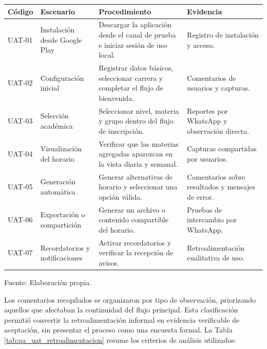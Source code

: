\begin{enumerate}
\begin{center}
\begin{minipage}{\linewidth}
\centering
\begin{tabularx}{\linewidth}{@{}p{1.8cm}>{\RaggedRight\arraybackslash}X>{\RaggedRight\arraybackslash}X>{\RaggedRight\arraybackslash}p{3.2cm}@{}}
\toprule
Código & Escenario & Procedimiento & Evidencia \\
\midrule
UAT-01 & Instalación desde Google Play & Descargar la aplicación desde el canal de prueba e iniciar sesión de uso local. & Registro de instalación y acceso. \\
UAT-02 & Configuración inicial & Registrar datos básicos, seleccionar carrera y completar el flujo de bienvenida. & Comentarios de usuarios y capturas. \\
UAT-03 & Selección académica & Seleccionar nivel, materia y grupo dentro del flujo de inscripción. & Reportes por WhatsApp y observación directa. \\
UAT-04 & Visualización del horario & Verificar que las materias agregadas aparezcan en la vista diaria y semanal. & Capturas compartidas por usuarios. \\
UAT-05 & Generación automática & Generar alternativas de horario y seleccionar una opción válida. & Comentarios sobre resultados y mensajes de error. \\
UAT-06 & Exportación o compartición & Generar un archivo o contenido compartible del horario. & Pruebas de intercambio por WhatsApp. \\
UAT-07 & Recordatorios y notificaciones & Activar recordatorios y verificar la recepción de avisos. & Retroalimentación cualitativa de uso. \\
\bottomrule
\end{tabularx}
\label{tab:qa_uat_escenarios}
Fuente: Elaboración propia.
\end{minipage}
\end{center}

Los comentarios recopilados se organizaron por tipo de observación, priorizando aquellos que afectaban la continuidad del flujo principal. Esta clasificación permitió convertir la retroalimentación informal en evidencia verificable de aceptación, sin presentar el proceso como una encuesta formal. La Tabla \ref{tab:qa_uat_retroalimentacion} resume los criterios de análisis utilizados:


\end{enumerate}
